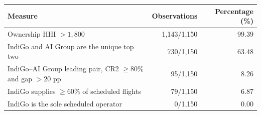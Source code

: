 \begin{tabularx}{\linewidth}{|>{\raggedright\arraybackslash}X|r|r|}
\hline
\textbf{Measure} & \textbf{Observations} & \textbf{Percentage (\%)} \\
\hline
Ownership HHI $>1{,}800$ & 1,143/1,150 & 99.39 \\
\hline
IndiGo and AI Group are the unique top two & 730/1,150 & 63.48 \\
\hline
IndiGo--AI Group leading pair, CR2 $\geq80\%$ and gap $>20$ pp & 95/1,150 & 8.26 \\
\hline
IndiGo supplies $\geq60\%$ of scheduled flights & 79/1,150 & 6.87 \\
\hline
IndiGo is the sole scheduled operator & 0/1,150 & 0.00 \\
\hline
\end{tabularx}
